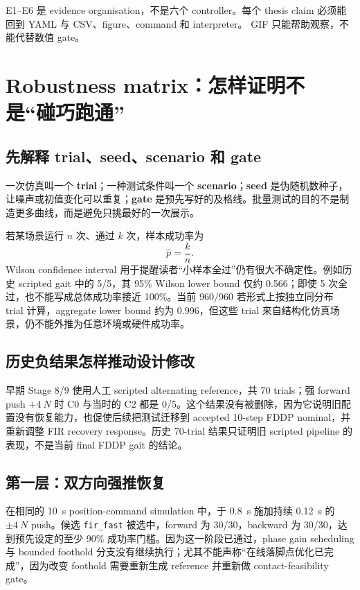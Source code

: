 \documentclass[UTF8,11pt,a4paper]{ctexart}
\newcommand{\code}[1]{\texttt{#1}}
\begin{document}
E1--E6 是 evidence organisation，不是六个 controller。每个 thesis claim 必须能回到 YAML 与 CSV、figure、command 和 interpreter。
GIF 只能帮助观察，不能代替数值 gate。

\section{Robustness matrix：怎样证明不是“碰巧跑通”}\label{sec:robustness}

\subsection{先解释 trial、seed、scenario 和 gate}

\begin{intuitionbox}
一次仿真叫一个 \textbf{trial}；一种测试条件叫一个 \textbf{scenario}；\textbf{seed} 是伪随机数种子，让噪声或初值变化可以重复；\textbf{gate} 是预先写好的及格线。批量测试的目的不是制造更多曲线，而是避免只挑最好的一次展示。
\end{intuitionbox}

若某场景运行 $n$ 次、通过 $k$ 次，样本成功率为
\begin{equation}
 \hat p=\frac{k}{n}.
\end{equation}
Wilson confidence interval 用于提醒读者“小样本全过”仍有很大不确定性。例如历史 scripted gait 中的 5/5，其 95\% Wilson lower bound 仅约 0.566；即使 5 次全过，也不能写成总体成功率接近 100\%。当前 960/960 若形式上按独立同分布 trial 计算，aggregate lower bound 约为 0.996，但这些 trial 来自结构化仿真场景，仍不能外推为任意环境或硬件成功率。

\subsection{历史负结果怎样推动设计修改}

早期 Stage 8/9 使用人工 scripted alternating reference，共 70 trials；强 forward push $+\SI{4}{N}$ 时 C0 与当时的 C2 都是 0/5。这个结果没有被删除，因为它说明旧配置没有恢复能力，也促使后续把测试迁移到 accepted 10-step FDDP nominal，并重新调整 FIR recovery response。历史 70-trial 结果只证明旧 scripted pipeline 的表现，不是当前 final FDDP gait 的结论。

\subsection{第一层：双方向强推恢复}

在相同的 \SI{10}{s} position-command simulation 中，于 \SI{0.8}{s} 施加持续 \SI{0.12}{s} 的 $\pm\SI{4}{N}$ push。候选 \code{fir\_fast} 被选中，forward 为 30/30，backward 为 30/30，达到预先设定的至少 90\% 成功率门槛。因为这一阶段已通过，phase gain scheduling 与 bounded foothold 分支没有继续执行；尤其不能声称“在线落脚点优化已完成”，因为改变 foothold 需要重新生成 reference 并重新做 contact-feasibility gate。
\end{document}
